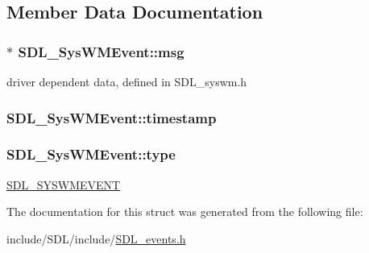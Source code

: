\subsection{Member Data Documentation}
\hypertarget{struct_s_d_l___sys_w_m_event_ad5e3dc68aa15582cd0641847d41c74e8}{
\subsubsection[{msg}]{$\ast$ S\-D\-L\-\_\-\-Sys\-W\-M\-Event\-::msg}}\label{struct_s_d_l___sys_w_m_event_ad5e3dc68aa15582cd0641847d41c74e8}
driver dependent data, defined in S\-D\-L\-\_\-syswm.\-h \hypertarget{struct_s_d_l___sys_w_m_event_a5d3cb97006d99b620c2671c27bd82c06}{
\subsubsection[{timestamp}]{ S\-D\-L\-\_\-\-Sys\-W\-M\-Event\-::timestamp}}\label{struct_s_d_l___sys_w_m_event_a5d3cb97006d99b620c2671c27bd82c06}
\hypertarget{struct_s_d_l___sys_w_m_event_a84697e96cb16bf6a570e10b5bfdcd392}{
\subsubsection[{type}]{ S\-D\-L\-\_\-\-Sys\-W\-M\-Event\-::type}}\label{struct_s_d_l___sys_w_m_event_a84697e96cb16bf6a570e10b5bfdcd392}
\hyperlink{_s_d_l__events_8h_a3b589e89be6b35c02e0dd34a55f3fccaa73749d735a18ce6ef17a09ee70d5dbe7}{S\-D\-L\-\_\-\-S\-Y\-S\-W\-M\-E\-V\-E\-N\-T} 

The documentation for this struct was generated from the following file\-:\begin{DoxyCompactItemize}
\item 
include/\-S\-D\-L/include/\hyperlink{_s_d_l__events_8h}{S\-D\-L\-\_\-events.\-h}\end{DoxyCompactItemize}
